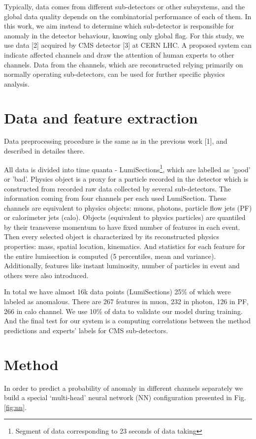 \documentclass[a4paper]{jpconf}
\begin{document}
Typically, data comes from different sub-detectors or other subsystems, and the global data quality depends on the combinatorial performance of each of them. In this work, we aim instead to determine which sub-detector is responsible for anomaly in the detector behaviour, knowing only global flag. For this study, we use data [2] acquired by CMS detector [3] at CERN LHC. A proposed system can indicate affected channels and draw the attention of human experts to other channels. Data from the channels, which are reconstructed relying primarily on normally operating sub-detectors, can be used for further specific physics analysis.


\section{Data and feature extraction}
Data preprocessing procedure is the same as in the previous work [1], and described in detailes there. 

All data is divided into time quanta - LumiSections\footnote{Segment of data corresponding to 23 seconds of data taking}, which are labelled as 'good' or 'bad'. Physics object is a proxy for a particle recorded in the detector which is constructed from recorded raw data collected by  several sub-detectors. The information coming from four channels per each used LumiSection. These channels are equivalent to physics objects: muons, photons, particle flow jets (PF) or calorimeter jets (calo). Objects (equivalent to physics particles) are quantiled by their transverse momentum to have fixed number of features in each event. Then every selected object is characterized by its reconstructed physics properties: mass, spatial location, kinematics. And statistics for each feature for the entire lumisection is computed (5 percentiles, mean and variance). 
Additionally, features like instant luminosity, number of particles in event and others were also introduced.

In total we have almost 16k data points (LumiSections) 25\% of which were labeled as anomalous. There are 267 features in muon, 232 in photon, 126 in PF, 266 in calo channel. We use 10\% of data to validate our model during training. And the final test for our system is a computing correlations between the method predictions and experts’ labels for CMS sub-detectors.

\section{Method}
In order to predict a probability of anomaly in different channels separately 
we build a special ‘multi-head’ neural network (NN) configuration presented in Fig. \ref{fig:nn}.
\end{document}
